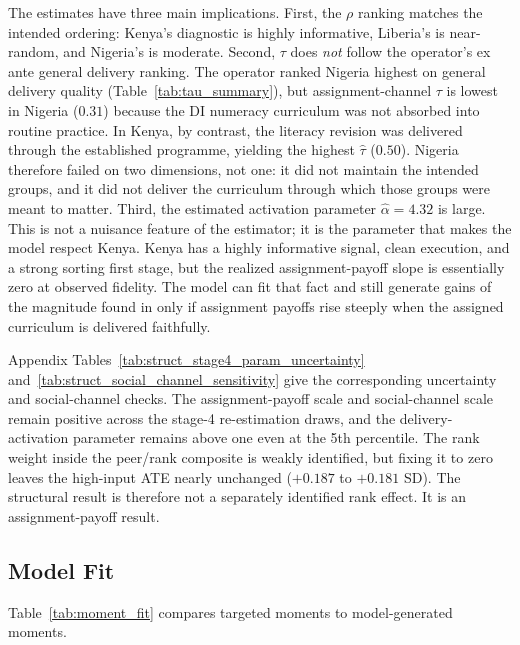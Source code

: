 \documentclass[11pt]{article}
\begin{document}
The estimates have three main implications. First, the $\rho$ ranking matches the intended ordering: Kenya's diagnostic is highly informative, Liberia's is near-random, and Nigeria's is moderate. Second, $\tau$ does \emph{not} follow the operator's ex ante general delivery ranking. The operator ranked Nigeria highest on general delivery quality (Table~\ref{tab:tau_summary}), but assignment-channel $\tau$ is lowest in Nigeria ($0.31$) because the DI numeracy curriculum was not absorbed into routine practice. In Kenya, by contrast, the literacy revision was delivered through the established programme, yielding the highest $\hat{\tau}$ ($0.50$). Nigeria therefore failed on two dimensions, not one: it did not maintain the intended groups, and it did not deliver the curriculum through which those groups were meant to matter. Third, the estimated activation parameter $\hat{\alpha}=4.32$ is large. This is not a nuisance feature of the estimator; it is the parameter that makes the model respect Kenya. Kenya has a highly informative signal, clean execution, and a strong sorting first stage, but the realized assignment-payoff slope is essentially zero at observed fidelity. The model can fit that fact and still generate gains of the magnitude found in \citet{duflo2011peer} only if assignment payoffs rise steeply when the assigned curriculum is delivered faithfully.

Appendix Tables~\ref{tab:struct_stage4_param_uncertainty} and~\ref{tab:struct_social_channel_sensitivity} give the corresponding uncertainty and social-channel checks. The assignment-payoff scale and social-channel scale remain positive across the stage-4 re-estimation draws, and the delivery-activation parameter remains above one even at the 5th percentile. The rank weight inside the peer/rank composite is weakly identified, but fixing it to zero leaves the high-input ATE nearly unchanged ($+0.187$ to $+0.181$ SD). The structural result is therefore not a separately identified rank effect. It is an assignment-payoff result.

\subsection{Model Fit}
\label{subsec:struct_fit}

Table~\ref{tab:moment_fit} compares targeted moments to model-generated moments.


\end{document}
